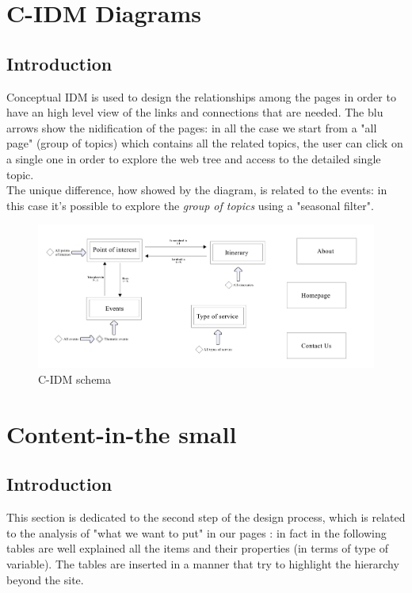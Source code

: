 \documentclass[table, 12pt]{article}
\begin{document}
\section{C-IDM Diagrams}
\subsection{Introduction}
Conceptual IDM is used to design the relationships among the pages in order to have an high level view of the links and connections that are needed. The blu arrows show the nidification of the pages: in all the case we start from a "all page" (group of topics) which contains all the related topics, the user can click on a single one in order to explore the web tree and access to the detailed single topic.\\
The unique difference, how showed by the diagram, is related to the events: in this case it's possible to explore the \textit{group of topics} using a "seasonal filter".

\begin{figure}[H]
    \begin{center}
        \includegraphics[width=\textwidth]{assets/Tables/C-IDM.png}
        \caption{C-IDM schema}
    \end{center}
\end{figure}

\section{Content-in-the small}
\subsection{Introduction}
This section is dedicated to the second step of the design process, which is related to the analysis of "what we want to put" in our pages : in fact in the following tables are well explained all the items and their properties (in terms of type of variable).
The tables are inserted in a manner that try to highlight the hierarchy beyond the site.
\end{document}
